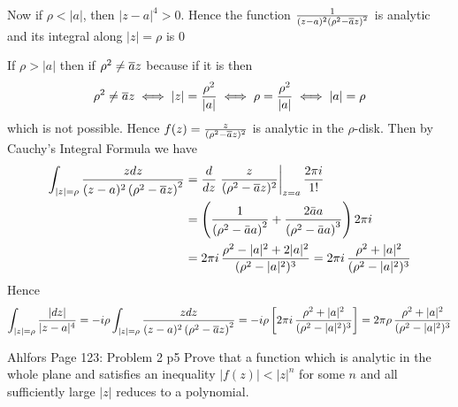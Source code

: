 \documentclass[a4paper, 11pt]{article}
\begin{document}
{\begin{itemize}
	Now if $\rho < |a|$, then $|z-a|^4>0$. Hence the function $\frac1{(z-a)^2\left(\rho^2-\overline{a} z\right)^2}$ is analytic and its integral  along $|z|=\rho$ is 0\parinn
	
	If $\rho > |a|$ then if $\rho^2\neq \overline{a} z$ because if it is then \begin{align*}
		\rho^2\neq \overline{a} z \iff |z| =\frac{\rho^2}{|a|} \iff \rho = \frac{\rho^2}{|a|} \iff |a|=\rho
	\end{align*} which is not possible. Hence $f(z)=\frac{z}{(\rho^2-\overline{a} z)^2}$ is analytic in the $\rho$-disk. Then by Cauchy's Integral Formula we have\begin{align*}
	\int_{|z|=\rho}\frac{zdz}{(z-a)^2\left(\rho^2-\overline{a} z\right)^2} & =\frac{d}{dz}\left. \frac{z}{(\rho^2-\overline{a} z)^2}\right|_{z=a} \frac{2\pi i}{1!}\\
	& = \left(\frac{1}{\left(\rho^2-\bar{a} a\right)^2}+\frac{2 \bar{a} a}{\left(\rho^2-\bar{a} a\right)^3}\right)  2 \pi i\\
	& = 2\pi i \, \frac{\rho^2-|a|^2+2|a|^2}{(\rho^2-|a|^2)^3}=2\pi i \, \frac{\rho^2+|a|^2}{(\rho^2-|a|^2)^3}
\end{align*}Hence $$	\int_{|z|=\rho}\frac{|dz|}{|z-a|^4}=-i\rho \int_{|z|=\rho}\frac{zdz}{(z-a)^2\left(\rho^2-\overline{a} z\right)^2}=-i\rho \left[ 2\pi i \, \frac{\rho^2+|a|^2}{(\rho^2-|a|^2)^3} \right]=2\pi\rho\, \frac{\rho^2+|a|^2}{(\rho^2-|a|^2)^3}$$
	\end{itemize}
	}
		
	
	\begin{problem}{%
			Ahlfors Page 123: Problem 2
		}{p5%
		}
		Prove that a function which is analytic in the whole plane and satisfies an inequality $|f(z)|<|z|^n$ for some $n$ and all sufficiently large $|z|$ reduces to a polynomial.
		
	\end{problem}
	
\end{document}

